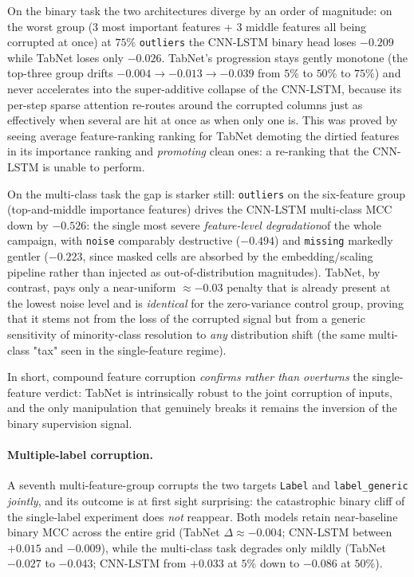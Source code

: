 \documentclass[a4paper, 9pt]{extarticle}
\begin{document}
On the binary task the two architectures diverge by an order of magnitude: on the worst group (3 most important features + 3 middle features all being corrupted at once) at $75\%$ \texttt{outliers} the CNN-LSTM binary head loses $-0.209$ while TabNet loses only $-0.026$. TabNet's progression stays gently monotone (the top-three group drifts $-0.004 \to -0.013 \to -0.039$ from $5\%$ to $50\%$ to $75\%$) and never accelerates into the super-additive collapse of the CNN-LSTM, because its per-step sparse attention re-routes around the corrupted columns just as effectively when several are hit at once as when only one is. This was proved by seeing average feature-ranking ranking for TabNet demoting the dirtied features in its importance ranking and \emph{promoting} clean ones: a re-ranking that the CNN-LSTM is unable to perform. 

On the multi-class task the gap is starker still: \texttt{outliers} on the six-feature group  (top-and-middle importance features) drives the CNN-LSTM multi-class MCC down by $-0.526$: the single most severe \emph{feature-level degradation}of the whole campaign, with \texttt{noise} comparably destructive ($-0.494$) and \texttt{missing} markedly gentler ($-0.223$, since masked cells are absorbed by the embedding/scaling pipeline rather than injected as out-of-distribution magnitudes). TabNet, by contrast, pays only a near-uniform $\approx -0.03$ penalty that is already present at the lowest noise level and is \emph{identical} for the zero-variance control group, proving that it stems not from the loss of the corrupted signal but from a
generic sensitivity of minority-class resolution to \emph{any} distribution shift (the same multi-class "tax" seen in the single-feature regime). 

In short, compound feature corruption \emph{confirms rather than overturns} the single-feature verdict: TabNet is intrinsically robust to the joint corruption of inputs, and the only manipulation that genuinely breaks it remains the inversion of the binary supervision signal.

\paragraph{Multiple-label corruption.}
A seventh multi-feature-group corrupts the two targets \texttt{Label} and \texttt{label\_generic} \emph{jointly}, and its outcome is at first sight surprising: the catastrophic binary cliff of the single-label experiment does \emph{not} reappear. Both models retain near-baseline binary MCC across the entire grid (TabNet $\Delta \approx -0.004$; CNN-LSTM between $+0.015$ and $-0.009$), while the multi-class task degrades only mildly (TabNet $-0.027$ to $-0.043$; CNN-LSTM from $+0.033$ at $5\%$ down to $-0.086$ at $50\%$). 
\end{document}
